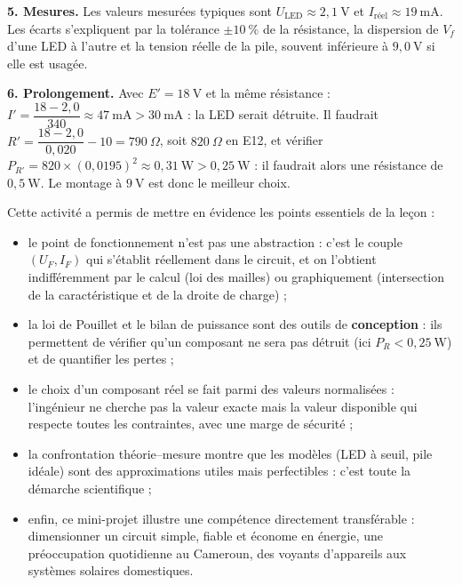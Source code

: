 \documentclass[11pt]{article}
\newcommand{\cle}[1]{{\popxbold\color{popdark}#1}}
\newcounter{popsec}
\newcounter{popsub}
\newcommand{\courssub}[1]{%
  \stepcounter{popsub}%
  \par\vspace{9pt}\noindent{\popxbold\fontsize{11.5}{13}\selectfont\color{popink}{\color{poporange}\thepopsec.\thepopsub}\hspace{6pt}#1}\par\nopagebreak\vspace{4pt}
}
\begin{document}
\begin{exoresolu}
\textbf{5. Mesures.} Les valeurs mesurées typiques sont $U_{\text{LED}} \approx 2{,}1\ \text{V}$ et $I_{\text{réel}} \approx 19\ \text{mA}$. Les écarts s'expliquent par la tolérance $\pm 10\ \%$ de la résistance, la dispersion de $V_f$ d'une LED à l'autre et la tension réelle de la pile, souvent inférieure à $9{,}0\ \text{V}$ si elle est usagée.

\textbf{6. Prolongement.} Avec $E' = 18\ \text{V}$ et la même résistance : $I' = \dfrac{18 - 2{,}0}{340} \approx 47\ \text{mA} > 30\ \text{mA}$ : la LED serait détruite. Il faudrait $R' = \dfrac{18 - 2{,}0}{0{,}020} - 10 = 790\ \Omega$, soit $820\ \Omega$ en E12, et vérifier $P_{R'} = 820 \times (0{,}0195)^2 \approx 0{,}31\ \text{W} > 0{,}25\ \text{W}$ : il faudrait alors une résistance de $0{,}5\ \text{W}$. Le montage à $9\ \text{V}$ est donc le meilleur choix.
\end{exoresolu}

\courssub{Bilan de l'activité}

Cette activité a permis de mettre en évidence les points essentiels de la leçon :
\begin{itemize}
\item le \cle{point de fonctionnement} n'est pas une abstraction : c'est le couple $(U_F, I_F)$ qui s'établit réellement dans le circuit, et on l'obtient indifféremment par le calcul (loi des mailles) ou graphiquement (intersection de la caractéristique et de la droite de charge) ;
\item la \cle{loi de Pouillet} et le bilan de puissance sont des outils de \textbf{conception} : ils permettent de vérifier qu'un composant ne sera pas détruit (ici $P_R < 0{,}25\ \text{W}$) et de quantifier les pertes ;
\item le \cle{choix d'un composant} réel se fait parmi des valeurs normalisées : l'ingénieur ne cherche pas la valeur exacte mais la valeur disponible qui respecte toutes les contraintes, avec une marge de sécurité ;
\item la confrontation théorie--mesure montre que les modèles (LED à seuil, pile idéale) sont des approximations utiles mais perfectibles : c'est toute la démarche scientifique ;
\item enfin, ce mini-projet illustre une compétence directement transférable : dimensionner un circuit simple, fiable et économe en énergie, une préoccupation quotidienne au Cameroun, des voyants d'appareils aux systèmes solaires domestiques.
\end{itemize}
\end{document}
